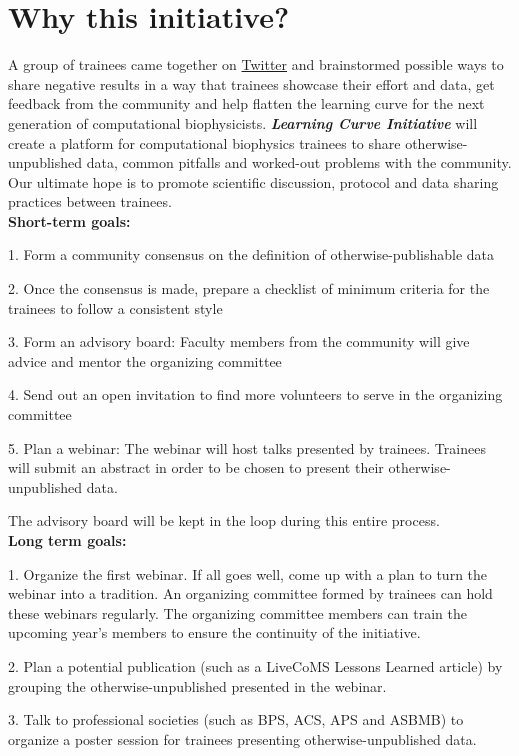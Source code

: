 \documentclass[9pt,lessons]{livecoms}
\theoremstyle{definition}
\theoremstyle{remark}
\begin{document}
\section{Why this initiative?}

A group of trainees came together on \href{https://twitter.com/poruthoor/status/1635740205373087744?s=20}{Twitter} and brainstormed possible ways to share negative results 
in a way that trainees showcase their effort and data, get feedback from the community and help flatten the learning curve for the next generation of computational 
biophysicists. \textbf{\textit{Learning Curve Initiative}} will create a platform for computational biophysics trainees to share otherwise-unpublished data, common 
pitfalls and worked-out problems with the community. Our ultimate hope is to promote scientific discussion, protocol and data sharing practices between trainees.\\

\textbf{Short-term goals:}

1. Form a community consensus on the definition of otherwise-publishable data

2. Once the consensus is made, prepare a checklist of minimum criteria for the trainees to follow a consistent style

3. Form an advisory board: Faculty members from the community will give advice and mentor the organizing committee

4. Send out an open invitation to find more volunteers to serve in the organizing committee

5. Plan a webinar: The webinar will host talks presented by trainees. Trainees will submit an abstract in order to be chosen to present their otherwise-unpublished data. 

The advisory board will be kept in the loop during this entire process.\\

\textbf{Long term goals:}

1. Organize the first webinar. If all goes well, come up with a plan to turn the webinar into a tradition. An organizing committee formed by trainees can hold these 
webinars regularly. The organizing committee members can train the upcoming year’s members to ensure the continuity of the initiative.

2. Plan a potential publication (such as a LiveCoMS Lessons Learned article) by grouping the otherwise-unpublished presented in the webinar.

3. Talk to professional societies (such as BPS, ACS, APS and ASBMB) to organize a poster session for trainees presenting otherwise-unpublished data.
\end{document}
